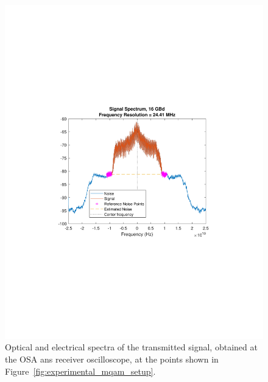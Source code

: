 \begin{refsection}
\begin{figure}[H]
\begin{minipage}{0.43\textwidth}
	\label{fig:16GBdOptiSpect}
		\end{minipage}
	\begin{minipage}{0.43\textwidth}
		\centering
		\includegraphics[clip, trim=4cm 8cm 4cm 8cm, width=1\textwidth]{./sdf/m_qam_system/figures/expResults/16GBdSpectrum.pdf}
		\caption{}
		\label{fig:16GBdSpect}
	\end{minipage}
	\caption{Optical and electrical spectra of the transmitted signal, obtained at the OSA ans receiver oscilloscope, at the points shown in Figure~\ref{fig:experimental_mqam_setup}.}
\end{figure}



\end{refsection}
